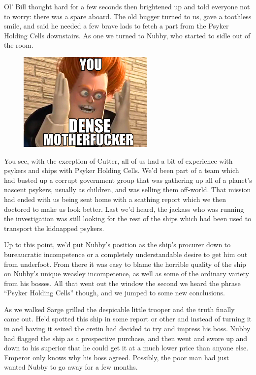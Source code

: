 Ol’ Bill thought hard for a few seconds then brightened up and told everyone not to worry: 
there was a spare aboard. 
The old bugger turned to us, gave a toothless smile, and said he needed a few brave lads to fetch a part from the Psyker Holding Cells downstairs. 
As one we turned to Nubby, who started to sidle out of the room.

\begin{figure}
	\begin{center}
		\includegraphics[width=\figwidth]{pics/7/36.png}
	\end{center}
\end{figure}
You see, with the exception of Cutter, all of us had a bit of experience with psykers and ships with Psyker Holding Cells. 
We’d been part of a team which had busted up a corrupt government group that was gathering up all of a planet’s nascent psykers, usually as children, and was selling them off-world. 
That mission had ended with us being sent home with a scathing report which we then doctored to make us look better. 
Last we’d heard, the jackass who was running the investigation was still looking for the rest of the ships which had been used to transport the kidnapped psykers.

Up to this point, we’d put Nubby’s position as the ship’s procurer down to bureaucratic incompetence or a completely understandable desire to get him out from underfoot. 
From there it was easy to blame the horrible quality of the ship on Nubby’s unique weasley incompetence, as well as some of the ordinary variety from his bosses. 
All that went out the window the second we heard the phrase “Psyker Holding Cells” though, and we jumped to some new conclusions.

As we walked Sarge grilled the despicable little trooper and the truth finally came out. 
He’d spotted this ship in some report or other and instead of turning it in and having it seized the cretin had decided to try and impress his boss. 
Nubby had flagged the ship as a prospective purchase, and then went and swore up and down to his superior that he could get it at a much lower price than anyone else. 
Emperor only knows why his boss agreed. 
Possibly, the poor man had just wanted Nubby to go away for a few months.

